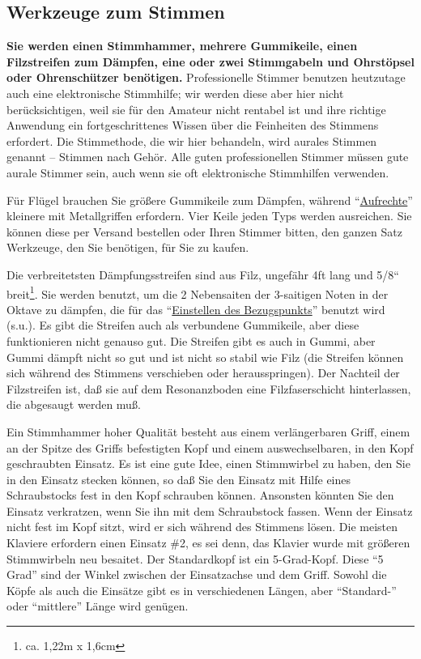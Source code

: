 
\subsection{Werkzeuge zum Stimmen}
\label{c2_3}

\textbf{Sie werden einen Stimmhammer, mehrere Gummikeile, einen Filzstreifen zum Dämpfen, eine oder zwei Stimmgabeln und Ohrstöpsel oder Ohrenschützer benötigen.}
Professionelle Stimmer benutzen heutzutage auch eine elektronische Stimmhilfe; wir werden diese aber hier nicht berücksichtigen, weil sie für den Amateur nicht rentabel ist und ihre richtige Anwendung ein fortgeschrittenes Wissen über die Feinheiten des Stimmens erfordert.
Die Stimmethode, die wir hier behandeln, wird aurales Stimmen genannt -- Stimmen nach Gehör.
Alle guten professionellen Stimmer müssen gute aurale Stimmer sein, auch wenn sie oft elektronische Stimmhilfen verwenden.

Für Flügel brauchen Sie größere Gummikeile zum Dämpfen, während \enquote{\hyperref[upright]{Aufrechte}} kleinere mit Metallgriffen erfordern.
Vier Keile jeden Typs werden ausreichen.
Sie können diese per Versand bestellen oder Ihren Stimmer bitten, den ganzen Satz Werkzeuge, den Sie benötigen, für Sie zu kaufen.

Die verbreitetsten Dämpfungsstreifen sind aus Filz, ungefähr 4ft lang und 5/8`` breit\footnote{ca. 1,22m x 1,6cm}.
Sie werden benutzt, um die 2 Nebensaiten der 3-saitigen Noten in der Oktave zu dämpfen, die für das \enquote{\hyperref[c2_4]{Einstellen des Bezugspunkts}} benutzt wird (s.u.).
Es gibt die Streifen auch als verbundene Gummikeile, aber diese funktionieren nicht genauso gut.
Die Streifen gibt es auch in Gummi, aber Gummi dämpft nicht so gut und ist nicht so stabil wie Filz (die Streifen können sich während des Stimmens verschieben oder herausspringen).
Der Nachteil der Filzstreifen ist, daß sie auf dem Resonanzboden eine Filzfaserschicht hinterlassen, die abgesaugt werden muß.

Ein Stimmhammer hoher Qualität besteht aus einem verlängerbaren Griff, einem an der Spitze des Griffs befestigten Kopf und einem auswechselbaren, in den Kopf geschraubten Einsatz.
Es ist eine gute Idee, einen Stimmwirbel zu haben, den Sie in den Einsatz stecken können, so daß Sie den Einsatz mit Hilfe eines Schraubstocks fest in den Kopf schrauben können.
Ansonsten könnten Sie den Einsatz verkratzen, wenn Sie ihn mit dem Schraubstock fassen.
Wenn der Einsatz nicht fest im Kopf sitzt, wird er sich während des Stimmens lösen.
Die meisten Klaviere erfordern einen Einsatz \#2, es sei denn, das Klavier wurde mit größeren Stimmwirbeln neu besaitet.
Der Standardkopf ist ein 5-Grad-Kopf.
Diese \enquote{5 Grad} sind der Winkel zwischen der Einsatzachse und dem Griff.
Sowohl die Köpfe als auch die Einsätze gibt es in verschiedenen Längen, aber \enquote{Standard-} oder \enquote{mittlere} Länge wird genügen.
 

